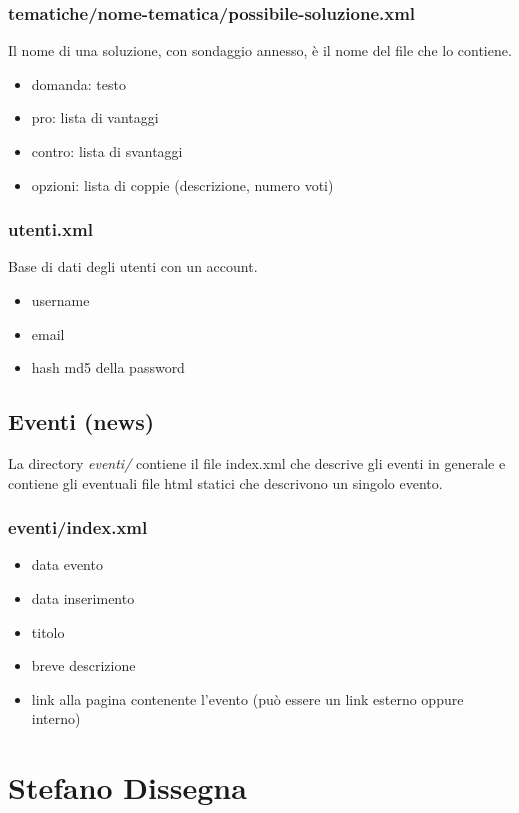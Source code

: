 \documentclass[a4paper,10pt]{article}
\begin{document}
\subsubsection{tematiche/nome-tematica/possibile-soluzione.xml}
Il nome di una soluzione, con sondaggio annesso, \`e il nome del file che lo contiene.
\begin{itemize}
 \item domanda: testo
 \item pro: lista di vantaggi
 \item contro: lista di svantaggi
 \item opzioni: lista di coppie (descrizione, numero voti)
\end{itemize}

\subsubsection{utenti.xml}
Base di dati degli utenti con un account.
\begin{itemize}
 \item username
 \item email
 \item hash md5 della password
\end{itemize}

\subsection{Eventi (news)}
La directory \textit{eventi/} contiene il file index.xml che descrive gli eventi in generale e contiene gli eventuali file html statici che descrivono un singolo evento.
 
\subsubsection{eventi/index.xml}
\begin{itemize}
 \item data evento
 \item data inserimento
 \item titolo
 \item breve descrizione
 \item link alla pagina contenente l'evento (pu\`o essere un link esterno oppure interno)
\end{itemize}

\section{Stefano Dissegna}
\end{document}
